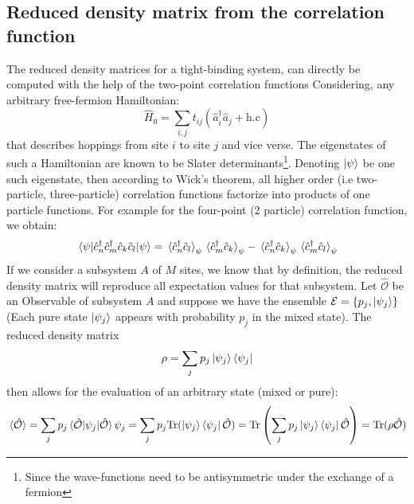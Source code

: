 \documentclass[11pt, a4paper, oneside]{book}
\theoremstyle{definition} %
\begin{document}
\subsection{Reduced density matrix from the correlation function}
The reduced density matrices for a tight-binding system, can directly be computed with the help of the two-point correlation functions \cite{Peschel_Ingo-Calculation_of_reduced_density_matrices_from_correlation_functions}\cite{Peschel_Ingo-Reduced_density_matrices_and_entanglement_entropy_in_free_lattice_models} Considering, any arbitrary free-fermion Hamiltonian:
	\begin{equation}
	\hat{H}_0 = \sum_{i,j} t_{ij}( \hat{a}_i^\dagger \hat{a}_j + \text{h.c})
	\label{eq:free_fermion_Hamiltonian}
	\end{equation}	
	that describes hoppings from site $i$ to site $j$ and vice verse. The eigenstates of such a Hamiltonian are known to be Slater determinants\footnote{Since the wave-functions need to be antisymmetric under the exchange of a fermion}. Denoting $\ket{\psi}$ be one such eigenstate, then according to Wick's theorem, all higher order (i.e two-particle, three-particle) correlation functions factorize into products of one particle functions. For example for the four-point (2 particle) correlation function, we obtain:
	\begin{equation}
		\mel{\psi}{\hat{c}_n^\dagger \hat{c}_m^\dagger \hat{c}_k \hat{c}_l}{\psi} = \expval*{\hat{c}_n^\dagger \hat{c}_l}_{\psi} \expval*{\hat{c}_m^\dagger \hat{c}_k}_{\psi} - \expval*{\hat{c}_n^\dagger \hat{c}_k}_\psi \expval*{\hat{c}_m^\dagger \hat{c}_l}_\psi
		\label{eq:Wick_theorem_correlationfunction}
	\end{equation}
	If we consider a subsystem $A$ of $M$ sites, we know that by definition, the reduced density matrix will reproduce all expectation values for that subsystem. Let $\hat{\mathcal{O}}$ be an Observable of subsystem $A$ and suppose we have the ensemble $\mathcal{E} = \{p_j , \ket{\psi_j}\}$ (Each pure state $\ket{\psi_j}$ appears with probability $p_j$ in the mixed state). The reduced density matrix	\begin{equation}
		\rho = \sum_j p_j \ket{\psi_j} \bra{\psi_j}
	\end{equation}
	then allows for the evaluation of an arbitrary state (mixed or pure):
	\begin{equation}
		\expval*{\hat{\mathcal{O}}} = \sum_j p_j \expval*{\psi_j}{\hat{\mathcal{O }}}{\psi_j} = \sum_j p_j \text{Tr}(\ket{\psi_j} \bra{\psi_j} \hat{\mathcal{O}}) =\text{Tr}\left( \sum_j p_j \ket{\psi_j}\bra{\psi_j} \hat{\mathcal{O}}\right) = \text{Tr}(\rho \hat{\mathcal{O}})
	\end{equation}
\end{document}
